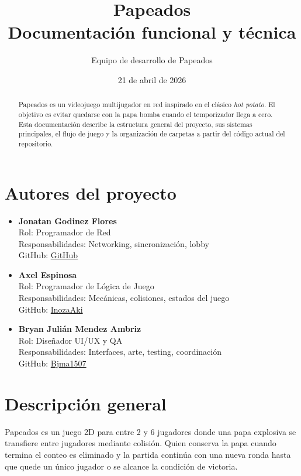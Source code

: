 \documentclass[11pt,a4paper]{article}
\title{\textbf{Papeados}\\[0.3em] Documentación funcional y técnica}
\author{Equipo de desarrollo de Papeados}
\date{21 de abril de 2026}
\begin{document}
\maketitle

\section*{Autores del proyecto}
\begin{itemize}[leftmargin=*, itemsep=0.6em]
    \item \textbf{Jonatan Godinez Flores} \\
    Rol: Programador de Red \\
    Responsabilidades: Networking, sincronización, lobby \\
    GitHub: \href{https://github.com/}{GitHub}

    \item \textbf{Axel Espinosa} \\
    Rol: Programador de Lógica de Juego \\
    Responsabilidades: Mecánicas, colisiones, estados del juego \\
    GitHub: \href{https://github.com/InozaAki}{InozaAki}

    \item \textbf{Bryan Julián Mendez Ambriz} \\
    Rol: Diseñador UI/UX y QA \\
    Responsabilidades: Interfaces, arte, testing, coordinación \\
    GitHub: \href{https://github.com/Bjma1507}{Bjma1507}
\end{itemize}

\begin{abstract}
Papeados es un videojuego multijugador en red inspirado en el clásico \emph{hot potato}. El objetivo es evitar quedarse con la papa bomba cuando el temporizador llega a cero. Esta documentación describe la estructura general del proyecto, sus sistemas principales, el flujo de juego y la organización de carpetas a partir del código actual del repositorio.
\end{abstract}

\clearpage
\tableofcontents
\clearpage

\section{Descripción general}
Papeados es un juego 2D para entre 2 y 6 jugadores donde una papa explosiva se transfiere entre jugadores mediante colisión. Quien conserva la papa cuando termina el conteo es eliminado y la partida continúa con una nueva ronda hasta que quede un único jugador o se alcance la condición de victoria.
\end{document}
